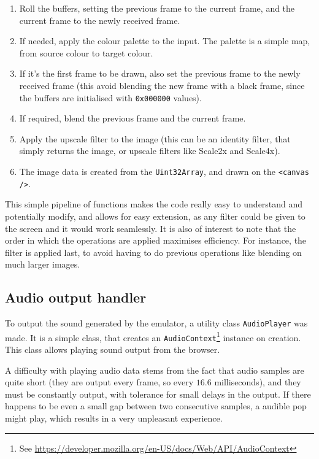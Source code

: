 \documentclass[11pt]{informatics-report}
\newcommand{\ftnt}[1]{\footnote{See \url{#1}}}
\begin{document}
\begin{enumerate}[itemsep=0mm]
	\item Roll the buffers, setting the previous frame to the current frame, and the current frame to the newly received frame.
	\item If needed, apply the colour palette to the input. The palette is a simple map, from source colour to target colour.
	\item If it's the first frame to be drawn, also set the previous frame to the newly received frame (this avoid blending the new frame with a black frame, since the buffers are initialised with \texttt{0x000000} values).
	\item If required, blend the previous frame and the current frame.
	\item Apply the upscale filter to the image (this can be an identity filter, that simply returns the image, or upscale filters like Scale2x and Scale4x).
	\item The image data is created from the \texttt{Uint32Array}, and drawn on the \texttt{<canvas />}.
\end{enumerate}

This simple pipeline of functions makes the code really easy to understand and potentially modify, and allows for easy extension, as any filter could be given to the screen and it would work seamlessly. It is also of interest to note that the order in which the operations are applied maximises efficiency. For instance, the filter is applied last, to avoid having to do previous operations like blending on much larger images.

\subsection{Audio output handler}

To output the sound generated by the emulator, a utility class \texttt{AudioPlayer} was made. It is a simple class, that creates an \texttt{AudioContext}\ftnt{https://developer.mozilla.org/en-US/docs/Web/API/AudioContext} instance on creation. This class allows playing sound output from the browser.

A difficulty with playing audio data stems from the fact that audio samples are quite short (they are output every frame, so every $16.6$ milliseconds), and they must be constantly output, with tolerance for small delays in the output. If there happens to be even a small gap between two consecutive samples, a audible pop might play, which results in a very unpleasant experience.
\end{document}
